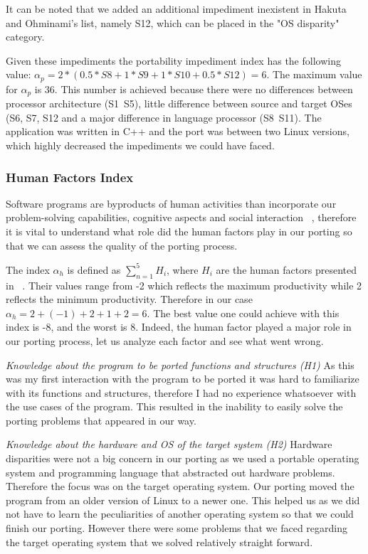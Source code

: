 It can be noted that we added an additional impediment inexistent in Hakuta and
Ohminami's list, namely S12, which can be placed in the "OS disparity" category.

Given these impediments the portability impediment index has the following
value: $\alpha_p = 2 * (0.5 * S8 + 1 * S9 + 1 * S10 + 0.5 * S12) = 6$. The
maximum value for $\alpha_p$ is 36. This number is achieved because there were
no differences between processor architecture (S1~S5), little difference between
source and target OSes (S6, S7, S12 and a major difference in language processor
(S8~S11). The application was written in C++ and the port was between two Linux
versions, which highly decreased the impediments we could have faced.

\subsubsection{Human Factors Index}

Software programs are byproducts of human
activities than incorporate our problem-solving capabilities, cognitive aspects
and social interaction ~\cite{b3}, therefore it is vital to understand what role
did the human factors play in our porting so that we can assess the quality of
the porting process. 

The index $\alpha_h$ is defined as $\sum_{n=1}^{5} H_i$, where $H_i$ are the
human factors presented in ~\cite{b2}. Their values range from -2 which reflects
the maximum productivity while 2 reflects the minimum productivity. Therefore
in our case $\alpha_h = 2 + (-1) + 2 + 1 + 2 = 6$. The best value one could
achieve with this index is -8, and the worst is 8. Indeed, the human factor
played a major role in our porting process, let us analyze each factor and see
what went wrong.

\textit{Knowledge about the program to be ported functions and structures (H1)} 
As this was my first interaction with the program to be ported it was hard to
familiarize with its functions and structures, therefore I had no experience
whatsoever with the use cases of the program. This resulted in the inability to
easily solve the porting problems that appeared in our way.

\textit{Knowledge about the hardware and OS of the target system (H2)}
Hardware disparities were not a big concern in our porting as we used a portable
operating system and programming language that abstracted out hardware problems.
Therefore the focus was on the target operating system. Our porting moved the
program from an older version of Linux to a newer one. This helped us as we
did not have to learn the peculiarities of another operating system so that we
could finish our porting. However there were some problems that we faced
regarding the target operating system that we solved relatively straight
forward.

